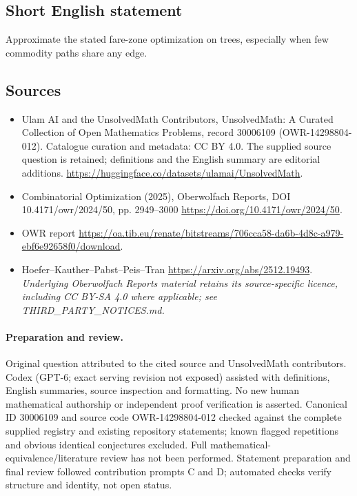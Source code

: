 \documentclass[11pt]{article}
\begin{document}
\subsection{Short English statement}
Approximate the stated fare-zone optimization on trees, especially when few commodity paths share any edge.
\subsection{Sources}
\begin{itemize}
\item[\hypertarget{source:30006109:1}{S1}] Ulam AI and the UnsolvedMath Contributors, UnsolvedMath: A Curated Collection of Open Mathematics Problems, record 30006109 (OWR-14298804-012). Catalogue curation and metadata: CC BY 4.0. The supplied source question is retained; definitions and the English summary are editorial additions.
\url{https://huggingface.co/datasets/ulamai/UnsolvedMath}.
\item[\hypertarget{source:30006109:2}{S2}] Combinatorial Optimization (2025), Oberwolfach Reports, DOI 10.4171/owr/2024/50, pp. 2949--3000
\url{https://doi.org/10.4171/owr/2024/50}.
\item[\hypertarget{source:30006109:3}{S3}] OWR report
\url{https://oa.tib.eu/renate/bitstreams/706cca58-da6b-4d8c-a979-ebf6e92658f0/download}.
\item[\hypertarget{source:30006109:4}{S4}] Hoefer--Kauther--Pabst--Peis--Tran
\url{https://arxiv.org/abs/2512.19493}.
\textit{Underlying Oberwolfach Reports material retains its source-specific licence, including CC BY-SA 4.0 where applicable; see THIRD\_PARTY\_NOTICES.md.}
\end{itemize}
\paragraph{Preparation and review.}
Original question attributed to the cited source and UnsolvedMath contributors. Codex (GPT-6; exact serving revision not exposed) assisted with definitions, English summaries, source inspection and formatting. No new human mathematical authorship or independent proof verification is asserted. Canonical ID 30006109 and source code OWR-14298804-012 checked against the complete supplied registry and existing repository statements; known flagged repetitions and obvious identical conjectures excluded. Full mathematical-equivalence/literature review has not been performed. Statement preparation and final review followed contribution prompts C and D; automated checks verify structure and identity, not open status.
\label{end:30006109}
\end{document}
